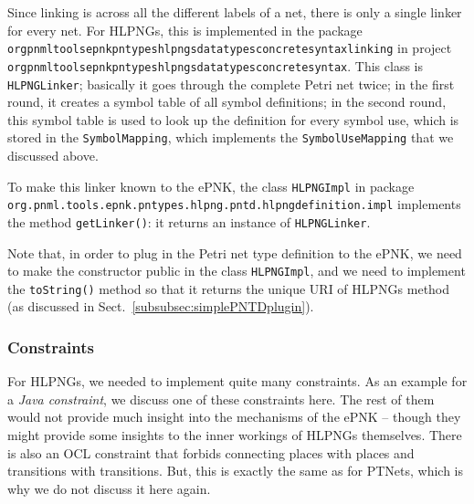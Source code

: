 Since linking is across all the different labels of a net, there is only a
single linker for every net. For HLPNGs, this is implemented in the package
{\tt org\qnsep{}pnml\qnsep{}tools\qnsep{}epnk\qnsep{}pntypes\qnsep{}hlpngs\qnsep{}datatypes\qnsep{}concretesyntax\qnsep{}linking}
in project {\tt
org\qnsep{}pnml\qnsep{}tools\qnsep{}epnk\qnsep{}pntypes\qnsep{}hlpngs\qnsep{}datatypes\qnsep{}concretesyntax}.
This class is {\tt HLPNGLinker}; basically it goes through the complete Petri net twice; in the first round, it creates a symbol table of all symbol
definitions; in the second round, this symbol table is used to look up the
definition for every symbol use, which is stored in the {\tt SymbolMapping},
which implements the {\tt SymbolUseMapping} that we discussed above.

To make this linker known to the ePNK, the class {\tt HLPNGImpl} in
package {\tt
org.pnml.tools.epnk.pntypes.hlpng.pntd.hlpngdefinition.impl} implements the
method {\tt getLinker()}: it returns an instance of {\tt HLPNGLinker}.

Note that, in order to plug in the Petri net type definition to the ePNK,
we need to make the constructor public in the
class {\tt HLPNGImpl}, and we need to implement the {\tt toString()} method
so that it returns the unique URI of HLPNGs method
(as discussed in Sect.~\ref{subsubsec:simplePNTDplugin}).%

\subsubsection{Constraints}
\label{subsubsec:PNTDConstraints}

For HLPNGs, we needed to implement quite many constraints. As an example
for a \emph{Java constraint}, we discuss one of these constraints here. The rest
of them would not provide much insight into the mechanisms of the ePNK -- though they
might provide some insights to the inner workings of HLPNGs themselves.
There is also an OCL constraint that forbids connecting places with places
and transitions with transitions. But, this is exactly the same as for PTNets,
which is why we do not discuss it here again.

